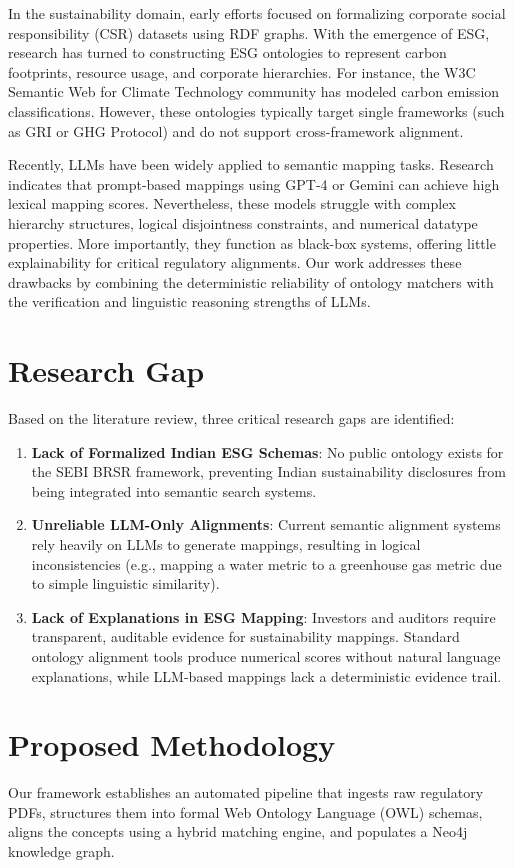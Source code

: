 \documentclass[journal,compsoc]{IEEEtran}
\begin{document}
\begin{itemize}
In the sustainability domain, early efforts focused on formalizing corporate social responsibility (CSR) datasets using RDF graphs. With the emergence of ESG, research has turned to constructing ESG ontologies to represent carbon footprints, resource usage, and corporate hierarchies. For instance, the W3C Semantic Web for Climate Technology community has modeled carbon emission classifications. However, these ontologies typically target single frameworks (such as GRI or GHG Protocol) and do not support cross-framework alignment.

Recently, LLMs have been widely applied to semantic mapping tasks. Research indicates that prompt-based mappings using GPT-4 or Gemini can achieve high lexical mapping scores. Nevertheless, these models struggle with complex hierarchy structures, logical disjointness constraints, and numerical datatype properties. More importantly, they function as black-box systems, offering little explainability for critical regulatory alignments. Our work addresses these drawbacks by combining the deterministic reliability of ontology matchers with the verification and linguistic reasoning strengths of LLMs.

\section{Research Gap}
Based on the literature review, three critical research gaps are identified:
\begin{enumerate}
    \item \textbf{Lack of Formalized Indian ESG Schemas}: No public ontology exists for the SEBI BRSR framework, preventing Indian sustainability disclosures from being integrated into semantic search systems.
    \item \textbf{Unreliable LLM-Only Alignments}: Current semantic alignment systems rely heavily on LLMs to generate mappings, resulting in logical inconsistencies (e.g., mapping a water metric to a greenhouse gas metric due to simple linguistic similarity).
    \item \textbf{Lack of Explanations in ESG Mapping}: Investors and auditors require transparent, auditable evidence for sustainability mappings. Standard ontology alignment tools produce numerical scores without natural language explanations, while LLM-based mappings lack a deterministic evidence trail.
\end{enumerate}

\section{Proposed Methodology}
Our framework establishes an automated pipeline that ingests raw regulatory PDFs, structures them into formal Web Ontology Language (OWL) schemas, aligns the concepts using a hybrid matching engine, and populates a Neo4j knowledge graph.


\end{itemize}
\end{document}

